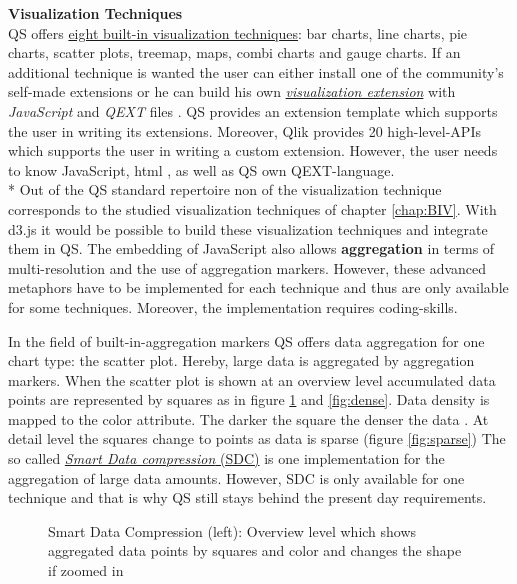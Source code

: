 \textbf{Visualization Techniques}\\
QS offers \href{https://help.qlik.com/en-US/sense/2.1/Subsystems/Hub/Content/Visualizations/visualizations.htm}{eight built-in visualization techniques}: bar charts, line charts, pie charts, scatter plots, treemap, maps, combi charts and gauge charts. If an additional technique is wanted the user can either install one of the community's self-made extensions or he can build his own \href{https://help.qlik.com/en-US/sense-developer/3.2/Subsystems/Extensions/Content/extensions-getting-started.htm}{\textit{visualization extension}} with \textit{JavaScript} and \textit{QEXT} files  \cite{qlikWorkbench}. QS provides an extension template which supports the user in writing its extensions. Moreover, Qlik provides 20 high-level-APIs which supports the user in writing a custom extension. However, the user needs to know JavaScript, html  \cite{qlikVisExtensions}, as well as QS own QEXT-language. \\*
Out of the QS standard repertoire non of the visualization technique corresponds to the studied visualization techniques of chapter \ref{chap:BIV}. With d3.js it would be possible to build these visualization techniques and integrate them in QS. 
The embedding of JavaScript also allows \textbf{aggregation} in terms of multi-resolution and the use of aggregation markers. However, these advanced metaphors have to be implemented for each technique and thus are only available for some techniques. Moreover, the implementation requires coding-skills. 

In the field of built-in-aggregation markers QS offers data aggregation for one chart type: the scatter plot. Hereby, large data is aggregated by aggregation markers. When the scatter plot is shown at an overview level accumulated data points are represented by squares as in figure \ref{fig:smartdatacompression} and \ref{fig:dense}. Data density is mapped to the color attribute.  The darker the square the denser the data  \cite{qlikScatter}. At detail level the squares change to points as data is sparse  (figure \ref{fig:sparse}) The so called \href{https://help.qlik.com/en-US/sense/2.1/Subsystems/Hub/Content/Visualizations/scatter plot/scatter-plot.htm}{\textit{Smart Data compression} (SDC)} is one implementation for the aggregation of large data amounts. However, SDC is only available for one technique and that is why QS still stays behind the present day requirements.


\begin{figure}[H]
    \centering
    \caption{Smart Data Compression  (left): Overview level which shows aggregated data points by squares and color and changes the shape if zoomed in}
    \label{fig:smartdatacompression}
\end{figure}


